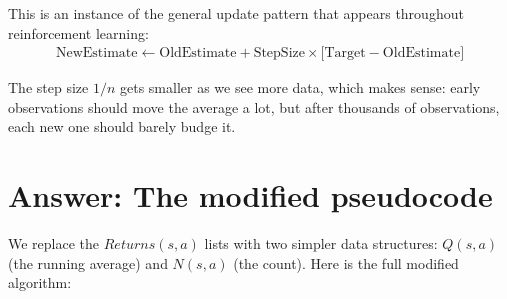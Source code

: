 \documentclass[11pt]{article}
\begin{document}
This is an instance of the general update pattern that appears throughout reinforcement learning:
\begin{align}
    \text{NewEstimate} \leftarrow \text{OldEstimate} + \text{StepSize} \times \Big[\text{Target} - \text{OldEstimate}\Big]
\end{align}

The step size $1/n$ gets smaller as we see more data, which makes sense: early observations should move the average a lot, but after thousands of observations, each new one should barely budge it.

\section*{Answer: The modified pseudocode}

We replace the $Returns(s, a)$ lists with two simpler data structures: $Q(s, a)$ (the running average) and $N(s, a)$ (the count). Here is the full modified algorithm:
\end{document}
